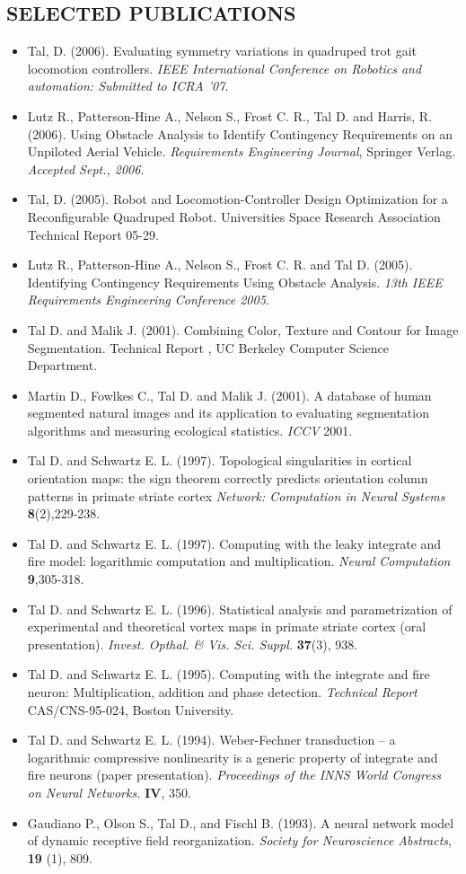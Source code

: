 \documentclass[conference,lettersize,twocolumn,twosize]{./IEEEtran}
\begin{document}
\subsection*{SELECTED PUBLICATIONS}
\begin{itemize}
\item{Tal, D. (2006).  Evaluating symmetry variations in quadruped
  trot gait locomotion controllers.  \emph{IEEE International Conference
    on Robotics and automation: Submitted to ICRA '07}.}
\item{Lutz R., Patterson-Hine A., Nelson S., Frost C. R., Tal D. and
  Harris, R. (2006).  Using Obstacle Analysis to Identify
  Contingency Requirements on an Unpiloted Aerial Vehicle.
  \emph{Requirements Engineering Journal}, Springer Verlag.
  \emph{Accepted Sept., 2006}.}
\item{Tal, D. (2005).  Robot and Locomotion-Controller Design
  Optimization for a Reconfigurable Quadruped Robot.  Universities
  Space Research Association Technical Report 05-29.}
\item{Lutz R., Patterson-Hine A., Nelson S., Frost C. R. and Tal
  D. (2005).  Identifying Contingency Requirements Using Obstacle
  Analysis. \emph{13th IEEE Requirements Engineering Conference
    2005}.}
\item{Tal D. and Malik J. (2001).  Combining Color, Texture and
  Contour for Image Segmentation.  Technical Report , UC Berkeley
  Computer Science Department.}
\item{Martin D., Fowlkes C., Tal D. and Malik J. (2001). A database
  of human segmented natural images and its application to
  evaluating segmentation algorithms and measuring ecological
  statistics. \emph{ ICCV} 2001. }
\item{Tal D. and Schwartz E. L. (1997).  Topological singularities
  in cortical orientation maps: the sign theorem correctly predicts
  orientation column patterns in primate striate cortex
  \emph{Network: Computation in Neural Systems} {\bf 8}(2),229-238.}
\item{Tal D. and Schwartz E. L. (1997).  Computing with the leaky
  integrate and fire model: logarithmic computation and
  multiplication.  \emph{Neural Computation} {\bf 9},305-318.}
\item{Tal D. and Schwartz E. L. (1996).  Statistical analysis and
  parametrization of experimental and theoretical vortex maps in
  primate striate cortex (oral presentation).
  \emph{Invest. Opthal. \& Vis. Sci. Suppl.} {\bf 37}(3), 938.}
\item{Tal D. and Schwartz E. L. (1995). Computing with the integrate
  and fire neuron: Multiplication, addition and phase
  detection. \emph{ Technical Report} CAS/CNS-95-024, Boston
  University.}
\item{Tal D. and Schwartz E. L. (1994).  Weber-Fechner transduction
  -- a logarithmic compressive nonlinearity is a generic property of
  integrate and fire neurons (paper presentation).
  \emph{Proceedings of the INNS World Congress on Neural Networks.}
       {\bf IV}, 350.}
\item{Gaudiano P., Olson S., Tal D., and Fischl B. (1993). A neural
  network model of dynamic receptive field
  reorganization. \emph{Society for Neuroscience Abstracts}, {\bf
    19} (1), 809.}
\end{itemize}
\end{document}
